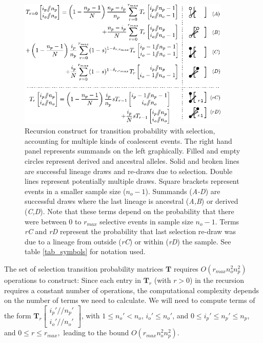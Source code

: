 \documentclass[review,nonatbib]{elsarticle}
\newcommand{\dslash}{/\!\!/}
\newcommand{\Coalc}[4]{\begin{bmatrix}#1\dslash #2 \\ #3\dslash #4 \end{bmatrix}}
\begin{document}
\begin{figure}
  \centering
  \includegraphics[width=0.9\textwidth]{fig/recurrence-selection-dynamic-failures-annotated.pdf}

  \caption{Recursion construct for transition probability with selection, accounting for multiple
    kinds of coalescent events. The right hand panel represents summands on the left graphically.
    Filled and empty circles represent derived and ancestral alleles. Solid and broken lines are
    successful lineage draws and re-draws due to selection. Double lines represent potentially
    multiple draws. Square brackets represent events in a smaller sample size ($n_o-1$). Summands
    (\textit{A-D}) are successful draws where the last lineage is ancestral (\textit{A,B}) or
    derived (\textit{C,D}). Note that these terms depend on the probability that there were between
    $0$ to $r_{max}$ selective events in sample size $n_o-1$. Terms \textit{rC} and \textit{rD}
    represent the probability that last selection re-draw was due to a lineage from outside
    (\textit{rC}) or within (\textit{rD}) the sample. See table \ref{tab_symbols} for notation used.
  }

  \label{fig_rec_selection_dynamic_fail}
\end{figure}

The set of selection transition probability matrices $\mathbf{T}$ requires $O(r_{max}n_o^2 n_p^2)$
operations to construct: Since each entry in $\mathbf{T}_{r}$ (with $r>0$)  in the recursion requires a
constant number of operations, the computational complexity depends on the number of terms we need
to calculate. We will need to compute terms of the form
$\mathbf{T}_{r}\Coalc{i_p'}{n_p'}{i_o'}{n_o'}$, with $1 \leq n_o'<n_o$, $i_o' \leq n_o'$, and $0\leq
i_p' \leq n_p' \leq n_p$, and $0\leq r \leq r_{max},$ leading to the bound $O(r_{max}n_o^2 n_p^2).$
\end{document}
